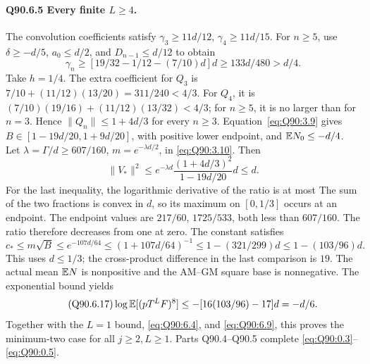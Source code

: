 \paragraph{Q90.6.5 Every finite \(L\ge\allowbreak 4\).}
The convolution coefficients satisfy
\(\gamma_3\ge\allowbreak 11d/12\), \(\gamma_4\ge\allowbreak 11d/15\).
For \(n\ge\allowbreak 5\), use \(\delta\ge\allowbreak -d/5\), \(a_0\le\allowbreak  d/2\),
and \(D_{n-1}\le\allowbreak  d/12\) to obtain
\begin{equation}\tag{Q90.6.14}\label{eq:Q90:6.14}
\gamma_n\ge[19/32-1/12-(7/10)d]d\ge133d/480>d/4.
\end{equation}
Take \(h=\allowbreak 1/4\). The extra coefficient for \(Q_3\) is
\(7/10+(11/12)(13/20)=\allowbreak 311/240<\allowbreak 4/3\).
For \(Q_4\), it is \((7/10)(19/16)+(11/12)(13/32)<\allowbreak 4/3\);
for \(n\ge\allowbreak 5\), it is no larger than for \(n=\allowbreak 3\).
Hence \(\|Q_n\|\le\allowbreak 1+4d/3\) for every \(n\ge\allowbreak 3\).
Equation~\eqref{eq:Q90:3.9} gives
\(B\in[1-19d/20,\allowbreak 1+9d/20]\), with positive lower endpoint, and
\(\mathbb E N_0\le\allowbreak -d/4\).
Let \(\lambda=\allowbreak \Gamma/d\ge\allowbreak 607/160\), \(m=\allowbreak e^{-\lambda d/2}\),
in \eqref{eq:Q90:3.10}. Then
\begin{equation}\tag{Q90.6.15}\label{eq:Q90:6.15}
\|V_*\|^2\le e^{-\lambda d}
 \frac{(1+4d/3)^2}{1-19d/20}d\le d.
\end{equation}
For the last inequality, the logarithmic derivative of the ratio
is at most
The sum of the two fractions is convex in \(d\), so its maximum
on \([0,\allowbreak 1/3]\) occurs at an endpoint. The endpoint values are
\(217/60\), \(1725/533\), both less than \(607/160\).
The ratio therefore decreases from one at zero.
The constant satisfies
\begin{equation}\tag{Q90.6.16}\label{eq:Q90:6.16}
c_*\le m\sqrt B\le e^{-107d/64}\le(1+107d/64)^{-1}
\le1-(321/299)d\le1-(103/96)d.
\end{equation}
This uses \(d\le\allowbreak 1/3\); the cross-product difference in the last
comparison is \(19\).
The actual mean \(\mathbb E N\) is nonpositive and the AM--GM square base
is nonnegative. The exponential bound yields
\begin{equation}\tag{Q90.6.17}\label{eq:Q90:6.17}
\log\mathbb E[(pT^LF)^8]\le-[16(103/96)-17]d=-d/6.
\end{equation}
Together with the \(L=\allowbreak 1\) bound, \eqref{eq:Q90:6.4}, and
\eqref{eq:Q90:6.9}, this proves the minimum-two case for all
\(j\ge\allowbreak 2,\allowbreak L\ge\allowbreak 1\). Parts Q90.4--Q90.5 complete
\eqref{eq:Q90:0.3}--\eqref{eq:Q90:0.5}.

